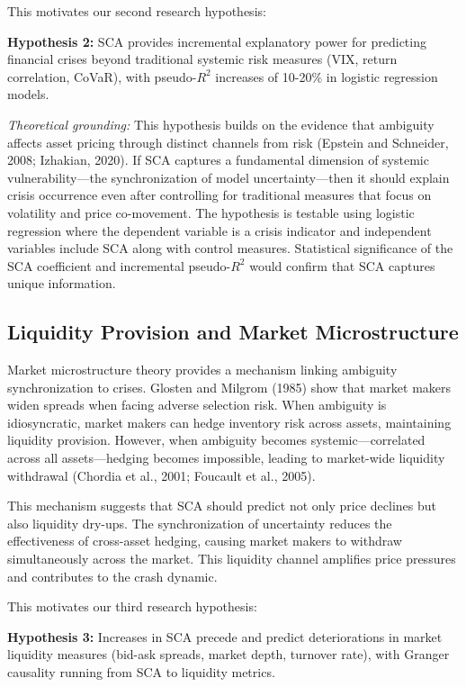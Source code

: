 \documentclass[preprint,12pt,authoryear]{elsarticle}
\begin{document}
This motivates our second research hypothesis:

\begin{center}
\textbf{Hypothesis 2:} SCA provides incremental explanatory power for predicting financial crises beyond traditional systemic risk measures (VIX, return correlation, CoVaR), with pseudo-$R^2$ increases of 10-20\% in logistic regression models.
\end{center}

\noindent
\textit{Theoretical grounding:} This hypothesis builds on the evidence that ambiguity affects asset pricing through distinct channels from risk (Epstein and Schneider, 2008; Izhakian, 2020). If SCA captures a fundamental dimension of systemic vulnerability—the synchronization of model uncertainty—then it should explain crisis occurrence even after controlling for traditional measures that focus on volatility and price co-movement. The hypothesis is testable using logistic regression where the dependent variable is a crisis indicator and independent variables include SCA along with control measures. Statistical significance of the SCA coefficient and incremental pseudo-$R^2$ would confirm that SCA captures unique information.

\subsection{Liquidity Provision and Market Microstructure}

Market microstructure theory provides a mechanism linking ambiguity synchronization to crises. Glosten and Milgrom (1985) show that market makers widen spreads when facing adverse selection risk. When ambiguity is idiosyncratic, market makers can hedge inventory risk across assets, maintaining liquidity provision. However, when ambiguity becomes systemic—correlated across all assets—hedging becomes impossible, leading to market-wide liquidity withdrawal (Chordia et al., 2001; Foucault et al., 2005).

This mechanism suggests that SCA should predict not only price declines but also liquidity dry-ups. The synchronization of uncertainty reduces the effectiveness of cross-asset hedging, causing market makers to withdraw simultaneously across the market. This liquidity channel amplifies price pressures and contributes to the crash dynamic.

This motivates our third research hypothesis:

\begin{center}
\textbf{Hypothesis 3:} Increases in SCA precede and predict deteriorations in market liquidity measures (bid-ask spreads, market depth, turnover rate), with Granger causality running from SCA to liquidity metrics.
\end{center}
\end{document}
